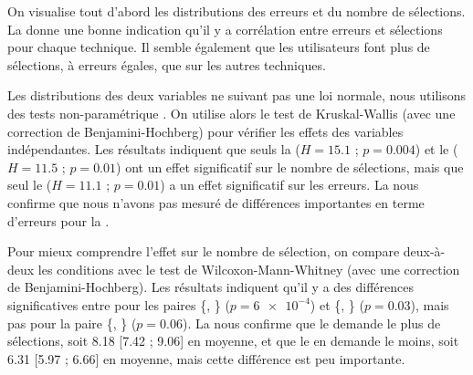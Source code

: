 On visualise tout d'abord les distributions des erreurs et du nombre de sélections. La  donne une bonne indication qu'il y a corrélation entre erreurs et sélections pour chaque technique. Il semble également que les utilisateurs  font plus de sélections, à erreurs égales, que sur les autres techniques.

Les distributions des deux variables ne suivant pas une loi normale, nous utilisons des tests non-paramétrique \citep{Wobbrock2016}. On utilise alors le test de Kruskal-Wallis (avec une correction de Benjamini-Hochberg) pour vérifier les effets des variables indépendantes. Les résultats indiquent que seuls la  ($H = \num{15.1}$ ; $p = \num{0.004}$) et le  ($H = \num{11.5}$ ; $p = \num{0.01}$) ont un effet significatif sur le nombre de sélections, mais que seul le  ($H = \num{11.1}$ ; $p = \num{0.01}$) a un effet significatif sur les erreurs. La  nous confirme que nous n'avons pas mesuré de différences importantes en terme d'erreurs pour la .


Pour mieux comprendre l'effet sur le nombre de sélection, on compare deux-à-deux les conditions  avec le test de Wilcoxon-Mann-Whitney (avec une correction de Benjamini-Hochberg). Les résultats indiquent qu'il y a des différences significatives entre pour les paires \{, \} ($p = \num{6e-4}$) et \{, \} ($p = \num{0.03}$), mais pas pour la paire \{, \} ($p = \num{0.06}$). La  nous confirme que le  demande le plus de sélections, soit \num{8.18} [\num{7.42} ; \num{9.06}] en moyenne, et que le  en demande le moins, soit \num{6.31} [\num{5.97} ; \num{6.66}] en moyenne, mais cette différence est peu importante.


